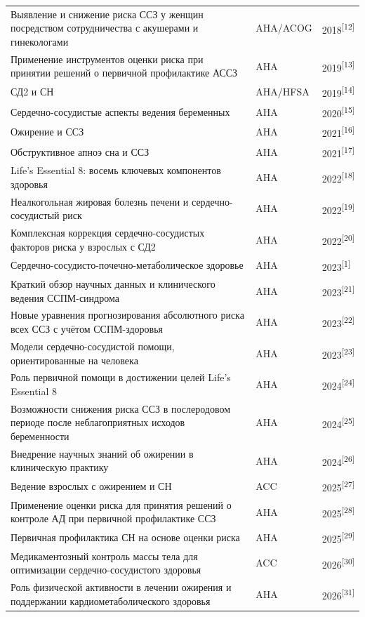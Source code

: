 \documentclass[11pt,a4paper]{article}
\newcommand{\src}[1]{\textsuperscript{[#1]}}
\begin{document}
{\begin{longtable}{P{0.56\textwidth}P{0.27\textwidth}P{0.10\textwidth}}
Выявление и снижение риска ССЗ у женщин посредством сотрудничества с акушерами и гинекологами & AHA/ACOG & 2018\src{12}\\
Применение инструментов оценки риска при принятии решений о первичной профилактике АССЗ & AHA & 2019\src{13}\\
СД2 и СН & AHA/HFSA & 2019\src{14}\\
Сердечно-сосудистые аспекты ведения беременных & AHA & 2020\src{15}\\
Ожирение и ССЗ & AHA & 2021\src{16}\\
Обструктивное апноэ сна и ССЗ & AHA & 2021\src{17}\\
Life's Essential 8: восемь ключевых компонентов здоровья & AHA & 2022\src{18}\\
Неалкогольная жировая болезнь печени и сердечно-сосудистый риск & AHA & 2022\src{19}\\
Комплексная коррекция сердечно-сосудистых факторов риска у взрослых с СД2 & AHA & 2022\src{20}\\
Сердечно-сосудисто-почечно-метаболическое здоровье & AHA & 2023\src{1}\\
Краткий обзор научных данных и клинического ведения ССПМ-синдрома & AHA & 2023\src{21}\\
Новые уравнения прогнозирования абсолютного риска всех ССЗ с учётом ССПМ-здоровья & AHA & 2023\src{22}\\
Модели сердечно-сосудистой помощи, ориентированные на человека & AHA & 2023\src{23}\\
Роль первичной помощи в достижении целей Life's Essential 8 & AHA & 2024\src{24}\\
Возможности снижения риска ССЗ в послеродовом периоде после неблагоприятных исходов беременности & AHA & 2024\src{25}\\
Внедрение научных знаний об ожирении в клиническую практику & AHA & 2024\src{26}\\
Ведение взрослых с ожирением и СН & ACC & 2025\src{27}\\
Применение оценки риска для принятия решений о контроле АД при первичной профилактике ССЗ & AHA & 2025\src{28}\\
Первичная профилактика СН на основе оценки риска & AHA & 2025\src{29}\\
Медикаментозный контроль массы тела для оптимизации сердечно-сосудистого здоровья & ACC & 2026\src{30}\\
Роль физической активности в лечении ожирения и поддержании кардиометаболического здоровья & AHA & 2026\src{31}\\
\bottomrule
\end{longtable}
}
\end{document}

